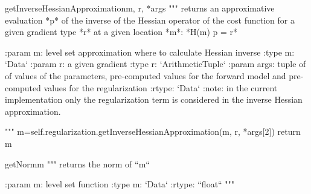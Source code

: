 \begin{methoddesc}[InversionCostFunction]{getInverseHessianApproximation}{m, r, *args}
        """
        returns an approximative evaluation *p* of the inverse of the Hessian operator of the cost function
        for a given gradient type *r* at a given location *m*: *H(m) p = r*

        :param m: level set approximation where to calculate Hessian inverse
        :type m: `Data`
        :param r: a given gradient
        :type r: `ArithmeticTuple`
        :param args: tuple of of values of the parameters, pre-computed values for the forward model and
                 pre-computed values for the regularization
        :rtype: `Data`
        :note: in the current implementation only the regularization term is
               considered in the inverse Hessian approximation.

        """
        m=self.regularization.getInverseHessianApproximation(m, r, *args[2])
        return m

\end{methoddesc}
        
\begin{methoddesc}[InversionCostFunction]{getNorm}{m}
        """
        returns the norm of ``m``

        :param m: level set function
        :type m: `Data`
        :rtype: ``float``
        """

\end{methoddesc}
